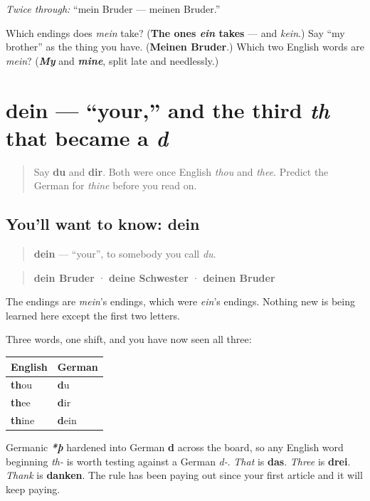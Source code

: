 \emph{Twice through:} \textquotedblleft{}mein Bruder — meinen Bruder.\textquotedblright{}

\begin{tcolorbox}[breakable,colback=teal!4,colframe=teal!35!black,title={Before you move on}]
Which endings does \emph{mein} take? (\textbf{The ones \emph{ein} takes} — and \emph{kein}.) Say \textquotedblleft{}my brother\textquotedblright{} as the thing you have. (\textbf{Meinen Bruder}.) Which two English words are \emph{mein}? (\emph{\textbf{My}} and \emph{\textbf{mine}}, split late and needlessly.)
\end{tcolorbox}
\section[dein]{dein — \textquotedblleft{}your,\textquotedblright{} and the third \emph{th} that became a \emph{d}}

\label{lesson:GE-C36-dein}



\begin{quote}
Say \textbf{du} and \textbf{dir}. Both were once English \emph{thou} and \emph{thee}. Predict the German for \emph{thine} before you read on.
\end{quote}

\subsection*{You'll want to know: dein}
\begin{quote}
\textbf{dein} — \textquotedblleft{}your\textquotedblright{}, to somebody you call \emph{du}.
\end{quote}

\begin{quote}
\textbf{dein Bruder} · \textbf{deine Schwester} · \textbf{deinen Bruder}
\end{quote}

The endings are \emph{mein}'s endings, which were \emph{ein}'s endings. Nothing new is being learned here except the first two letters.

\begin{cousinweb}
Three words, one shift, and you have now seen all three:

\noindent
\begin{tabularx}{\linewidth}{@{}>{\raggedright\arraybackslash}X>{\raggedright\arraybackslash}X@{}}
\toprule
\textbf{English} & \textbf{German} \\
\midrule
\textbf{th}ou & \textbf{d}u \\
\textbf{th}ee & \textbf{d}ir \\
\textbf{th}ine & \textbf{d}ein \\
\bottomrule
\end{tabularx}

Germanic \emph{\textbf{*þ}} hardened into German \textbf{d} across the board, so any English word beginning \emph{th-} is worth testing against a German \emph{d-}. \emph{That} is \textbf{das}. \emph{Three} is \textbf{drei}. \emph{Thank} is \textbf{danken}. The rule has been paying out since your first article and it will keep paying.
\end{cousinweb}

